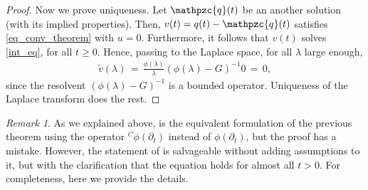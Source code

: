 \documentclass[reqno]{amsart}
\theoremstyle{remark}
\newtheorem{remark}[theorem]{Remark}
\numberwithin{equation}{section} %
\newcommand{\1}{\mathds{1}}
\begin{document}
\begin{proof}
		Now we prove uniqueness. Let $\mathpzc{q}(t)$ be an another solution (with its implied properties). Then, $v(t) = q(t) -\mathpzc{q}(t)$ satisfies \eqref{eq_conv_theorem} with $u= 0$. Furthermore, it follows that $v(t)$ solves \eqref{int_eq}, for all $t \geq 0$. Hence, passing to the Laplace space, {for all $\lambda$ large enough,}
		\begin{align}
			\widetilde{v}(\lambda) \, = \, \frac{\phi(\lambda)}{\lambda} (\phi(\lambda)-G)^{-1} 0 \, = \, 0,
		\end{align}
		since the resolvent $(\phi(\lambda)-G)^{-1}$ is a bounded operator. Uniqueness of the Laplace transform does the rest.
	\end{proof}
	
	
	
	\begin{remark}\label{r:914}
		As we explained above, \cite[Theorem 5.1]{toaldo_pota} is the equivalent formulation of the previous theorem using the operator $^C\phi(\partial_t)$ instead of $\phi(\partial_t)$, but the proof has a mistake. However, the statement of \cite[Theorem 5.1]{toaldo_pota} is salvageable without adding assumptions to it, but with the clarification that the equation holds for almost all $t>0$. For completeness, here we provide the details. 
		

\end{remark}
\end{document}
